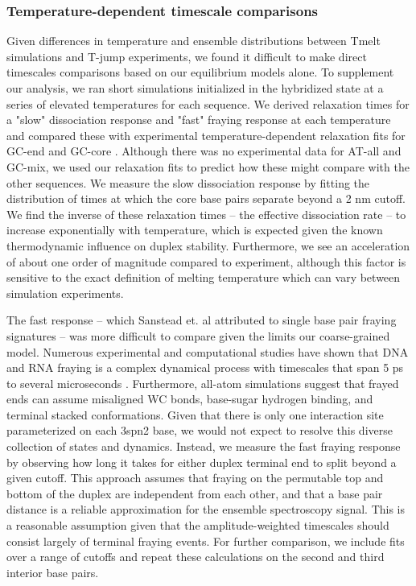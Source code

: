 \documentclass[journal=jpcbfk,manuscript=article]{achemso}
\begin{document}
\subsubsection{\label{sec:Results}Temperature-dependent timescale comparisons}

Given differences in temperature and ensemble distributions between Tmelt simulations and T-jump experiments, we found it difficult to make direct timescales comparisons based on our equilibrium models alone. To supplement our analysis, we ran short simulations initialized in the hybridized state at a series of elevated temperatures for each sequence. We derived relaxation times for a "slow" dissociation response and "fast" fraying response at each temperature and compared these with experimental temperature-dependent relaxation fits for GC-end and GC-core \citep{Sanstead2018DirectDehybridization}. Although there was no experimental data for AT-all and GC-mix, we used our relaxation fits to predict how these might compare with the other sequences. We measure the slow dissociation response by fitting the distribution of times at which the core base pairs separate beyond a 2 nm cutoff. We find the inverse of these relaxation times -- the effective dissociation rate -- to increase exponentially with temperature, which is expected given the known thermodynamic influence on duplex stability. Furthermore, we see an acceleration of about one order of magnitude compared to experiment, although this factor is sensitive to the exact definition of melting temperature which can vary between simulation experiments. 

The fast response -- which Sanstead et. al attributed to single base pair fraying signatures -- was more difficult to compare given the limits our coarse-grained model. Numerous experimental and computational studies have shown that DNA and RNA fraying is a complex dynamical process with timescales that span 5 ps to several microseconds \citep{ Nonin1995TerminalFraying, Nikolova2012ProbingSimulations, Andreatta2006UltrafastHelix, Galindo-Murillo2015ConvergenceDGCACGAACGAACGAACGC}. Furthermore, all-atom simulations suggest that frayed ends can assume misaligned WC bonds, base-sugar hydrogen binding, and terminal stacked conformations\citep{PinamontiTheModels, Zgarbova2014BaseRNA}. Given that there is only one interaction site parameterized on each 3spn2 base, we would not expect to resolve this diverse collection of states and dynamics. Instead, we measure the fast fraying response by observing how long it takes for either duplex terminal end to split beyond a given cutoff. This approach assumes that fraying on the permutable top and bottom of the duplex are independent from each other, and that a base pair distance is a reliable approximation for the ensemble spectroscopy signal. This is a reasonable assumption given that the amplitude-weighted timescales should consist largely of terminal fraying events. For further comparison, we include fits over a range of cutoffs and repeat these calculations on the second and third interior base pairs.
\end{document}
